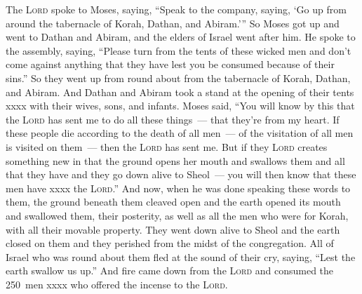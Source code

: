 \begin{inparaenum}
     The \textsc{Lord} spoke to Moses, saying,%
     ``Speak to the company, saying, `Go up from around the tabernacle of Korah, Dathan, and Abiram.'\thinspace''%
     So Moses got up and went to Dathan and Abiram, and the elders of Israel went after him.%
     He spoke to the assembly, saying, ``Please turn from the tents of these wicked men and don't come against anything that they have lest you be consumed because of their sins.''%
     So they went up from round about from the tabernacle of Korah, Dathan, and Abiram. And Dathan and Abiram took a stand at the opening of their tents xxxx with their wives, sons, and infants.%
     Moses said, ``You will know by this that the \textsc{Lord} has sent me to do all these things~--- that they're from my heart.%
     If these people die according to the death of all men~--- of the visitation of all men is visited on them~--- then the \textsc{Lord} has sent me.%
     But if they \textsc{Lord} creates something new in that the ground opens her mouth and swallows them and all that they have and they go down alive to Sheol~--- you will then know that these men have xxxx the \textsc{Lord}.''%
     And now, when he was done speaking these words to them, the ground beneath them cleaved open\understood%
     and the earth opened its mouth and swallowed them, their posterity, as well as all the men who were for Korah, with all their movable property.%
     They went down alive to Sheol and the earth closed on them and they perished from the midst of the congregation.%
     All of Israel who was round about them fled at the sound of their cry, saying, ``Lest the earth swallow us up.''%
     And fire came down from the \textsc{Lord} and consumed the 250~men xxxx who offered the incense to the \textsc{Lord}.%
\end{inparaenum}
